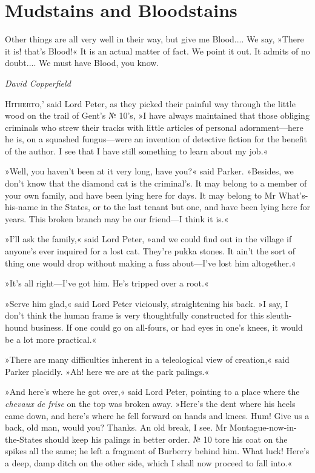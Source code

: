 \chapter{Mudstains and Bloodstains}

\epigraph{Other things are all very well in their way, but give me Blood.... We say, »There it is! that's Blood!« It is an actual matter of fact. We point it out. It admits of no doubt.... We must have Blood, you know.}{\textit{David Copperfield}}

\lettrine[lines=4,ante=`]{H}{itherto,}' said Lord Peter, as they picked their painful way through the little wood on the trail of Gent's № 10's, »I have always maintained that those obliging criminals who strew their tracks with little articles of personal adornment\allowbreak---\allowbreak here he is, on a squashed fungus\allowbreak---\allowbreak were an invention of detective fiction for the benefit of the author. I see that I have still something to learn about my job.«

»Well, you haven't been at it very long, have you?« said Parker.  »Besides, we don't know that the diamond cat is the criminal's. It may belong to a member of your own family, and have been lying here for days. It may belong to Mr What's-his-name in the States, or to the last tenant but one, and have been lying here for years. This broken branch may be our friend\allowbreak---\allowbreak I think it is.«

»I'll ask the family,« said Lord Peter, »and we could find out in the village if anyone's ever inquired for a lost cat. They're pukka stones. It ain't the sort of thing one would drop without making a fuss about\allowbreak---\allowbreak I've lost him altogether.«

»It's all right\allowbreak---\allowbreak I've got him. He's tripped over a root.«

»Serve him glad,« said Lord Peter viciously, straightening his back.  »I say, I don't think the human frame is very thoughtfully constructed for this sleuth-hound business. If one could go on all-fours, or had eyes in one's knees, it would be a lot more practical.«

»There are many difficulties inherent in a teleological view of creation,« said Parker placidly. »Ah! here we are at the park palings.«

»And here's where he got over,« said Lord Peter, pointing to a place where the \textit{chevaux de frise} on the top was broken away. »Here's the dent where his heels came down, and here's where he fell forward on hands and knees. Hum! Give us a back, old man, would you? Thanks.  An old break, I see. Mr Montague-now-in-the-States should keep his palings in better order. № 10 tore his coat on the spikes all the same; he left a fragment of Burberry behind him. What luck! Here's a deep, damp ditch on the other side, which I shall now proceed to fall into.«

